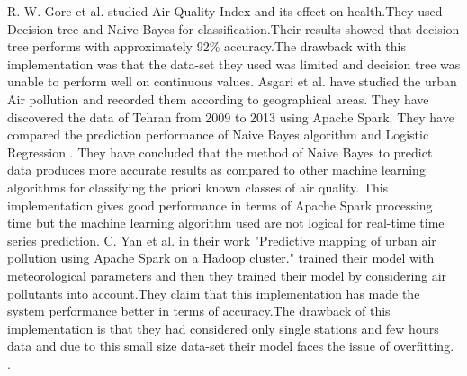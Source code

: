\documentclass{article}
\begin{document}
\begin{itemize}
R. W. Gore et al. studied Air Quality Index and its effect on health.They used Decision tree
and Naive Bayes for classification.Their results showed that decision tree performs with approximately 92\% accuracy.The drawback with this implementation was that the data-set they used was limited and decision tree was unable to perform well on continuous values.
Asgari et al. have studied the urban Air pollution and
recorded them according to geographical areas. They have discovered the data of Tehran from 2009 to 2013 using Apache Spark. They have compared the prediction performance of Naive Bayes algorithm and Logistic Regression . They have concluded that the method of Naive Bayes to predict data produces more accurate results as compared to other machine learning
algorithms for classifying the priori known classes of air
quality. This implementation gives good performance in terms of Apache
Spark processing time but the machine learning algorithm used are
not logical for real-time time series prediction\textsuperscript{\cite{ref26}}.
C. Yan et al. in their work "Predictive
mapping of urban air pollution using Apache Spark on a Hadoop cluster." trained their model with meteorological parameters and then they trained their model by considering air pollutants into account.They claim that this implementation has made the system performance better in terms of accuracy.The drawback of this implementation is that they had considered only single stations and few hours data and due to this small size data-set their model faces the issue of overfitting. \textsuperscript{\cite{ref27}}. 

\\ 
  \end{itemize}  
\end{document}
